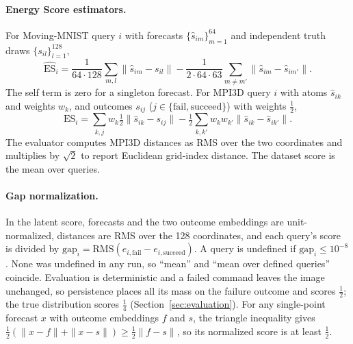 \paragraph{Energy Score estimators.} For Moving-MNIST query $i$ with forecasts $\{\hat s_{im}\}_{m=1}^{64}$ and independent truth draws $\{s_{il}\}_{l=1}^{128}$,
\[
\widehat{\mathrm{ES}}_i=\frac1{64\cdot128}\sum_{m,l}\|\hat s_{im}-s_{il}\|-\frac{1}{2\cdot64\cdot63}\sum_{m\neq m'}\|\hat s_{im}-\hat s_{im'}\| .
\]
The self term is zero for a singleton forecast. For MPI3D query $i$ with atoms $\hat s_{ik}$ and weights $w_k$, and outcomes $s_{ij}$ ($j\in\{\text{fail},\text{succeed}\}$) with weights $\tfrac12$,
\[
\mathrm{ES}_i=\sum_{k,j}w_k\tfrac12\|\hat s_{ik}-s_{ij}\|-\tfrac12\sum_{k,k'}w_kw_{k'}\|\hat s_{ik}-\hat s_{ik'}\| .
\]
The evaluator computes MPI3D distances as RMS over the two coordinates and multiplies by $\sqrt2$ to report Euclidean grid-index distance. The dataset score is the mean over queries.

\paragraph{Gap normalization.} In the latent score, forecasts and the two outcome embeddings are unit-normalized, distances are RMS over the 128 coordinates, and each query's score is divided by $\mathrm{gap}_i=\mathrm{RMS}(e_{i,\text{fail}}-e_{i,\text{succeed}})$. A query is undefined if $\mathrm{gap}_i\le10^{-8}$. None was undefined in any run, so ``mean'' and ``mean over defined queries'' coincide. Evaluation is deterministic and a failed command leaves the image unchanged, so persistence places all its mass on the failure outcome and scores $\tfrac12$; the true distribution scores $\tfrac14$ (Section~\ref{sec:evaluation}). For any single-point forecast $x$ with outcome embeddings $f$ and $s$, the triangle inequality gives $\tfrac12(\|x-f\|+\|x-s\|)\ge\tfrac12\|f-s\|$, so its normalized score is at least $\tfrac12$.

